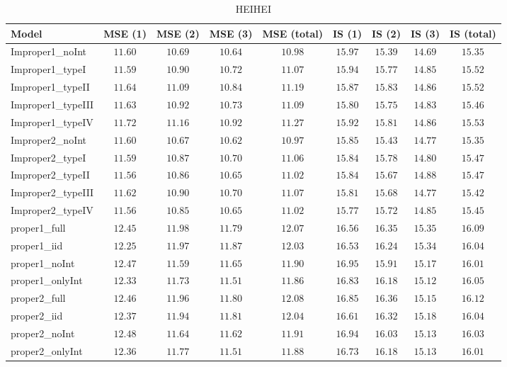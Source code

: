 \begin{table}

\caption{\label{tab:model-choice-sc1}HEIHEI}
\centering
\begin{tabular}{lcccccccc}
\hline
Model  & MSE (1) & MSE (2) & MSE (3) & MSE (total) & IS (1) & IS (2) & IS (3) & \multicolumn{1}{c}{IS (total)} \\ 
\hline
Improper1_noInt  & $11.60$ & $10.69$ & $10.64$ & $10.98$ & $15.97$ & $15.39$ & $14.69$ & $15.35$ \\
Improper1_typeI  & $11.59$ & $10.90$ & $10.72$ & $11.07$ & $15.94$ & $15.77$ & $14.85$ & $15.52$ \\
Improper1_typeII  & $11.64$ & $11.09$ & $10.84$ & $11.19$ & $15.87$ & $15.83$ & $14.86$ & $15.52$ \\
Improper1_typeIII  & $11.63$ & $10.92$ & $10.73$ & $11.09$ & $15.80$ & $15.75$ & $14.83$ & $15.46$ \\
Improper1_typeIV  & $11.72$ & $11.16$ & $10.92$ & $11.27$ & $15.92$ & $15.81$ & $14.86$ & $15.53$ \\
Improper2_noInt  & $11.60$ & $10.67$ & $10.62$ & $10.97$ & $15.85$ & $15.43$ & $14.77$ & $15.35$ \\
Improper2_typeI  & $11.59$ & $10.87$ & $10.70$ & $11.06$ & $15.84$ & $15.78$ & $14.80$ & $15.47$ \\
Improper2_typeII  & $11.56$ & $10.86$ & $10.65$ & $11.02$ & $15.84$ & $15.67$ & $14.88$ & $15.47$ \\
Improper2_typeIII  & $11.62$ & $10.90$ & $10.70$ & $11.07$ & $15.81$ & $15.68$ & $14.77$ & $15.42$ \\
Improper2_typeIV  & $11.56$ & $10.85$ & $10.65$ & $11.02$ & $15.77$ & $15.72$ & $14.85$ & $15.45$ \\
proper1_full  & $12.45$ & $11.98$ & $11.79$ & $12.07$ & $16.56$ & $16.35$ & $15.35$ & $16.09$ \\
proper1_iid  & $12.25$ & $11.97$ & $11.87$ & $12.03$ & $16.53$ & $16.24$ & $15.34$ & $16.04$ \\
proper1_noInt  & $12.47$ & $11.59$ & $11.65$ & $11.90$ & $16.95$ & $15.91$ & $15.17$ & $16.01$ \\
proper1_onlyInt  & $12.33$ & $11.73$ & $11.51$ & $11.86$ & $16.83$ & $16.18$ & $15.12$ & $16.05$ \\
proper2_full  & $12.46$ & $11.96$ & $11.80$ & $12.08$ & $16.85$ & $16.36$ & $15.15$ & $16.12$ \\
proper2_iid  & $12.37$ & $11.94$ & $11.81$ & $12.04$ & $16.61$ & $16.32$ & $15.18$ & $16.04$ \\
proper2_noInt  & $12.48$ & $11.64$ & $11.62$ & $11.91$ & $16.94$ & $16.03$ & $15.13$ & $16.03$ \\
proper2_onlyInt  & $12.36$ & $11.77$ & $11.51$ & $11.88$ & $16.73$ & $16.18$ & $15.13$ & $16.01$ \\
\hline 
\end{tabular}


\end{table}
